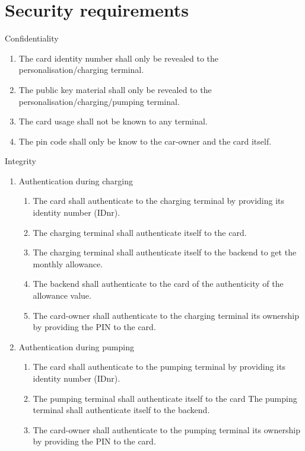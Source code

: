 \section*{Security requirements}
\begin{enumerate}
\item Confidentiality
	\begin{enumerate}
	\item The card identity number shall only be revealed to the personalisation/charging terminal.
	\item The public key material shall only be revealed to the personalisation/charging/pumping terminal.
	\item The card usage shall not be known to any terminal.
	\item The pin code shall only be know to the car-owner and the card itself.
	\end{enumerate}
\begin{minipage}{\linewidth}
\item Integrity
	\begin{enumerate}
	\item Authentication during charging
		\begin{enumerate}
		\item The card shall authenticate to the charging terminal by providing its identity number (IDnr).
		\item The charging terminal shall authenticate itself to the card.
		\item The charging terminal shall authenticate itself to the backend to get the monthly allowance.
		\item The backend shall authenticate to the card of the authenticity of the allowance value.
		\item The card-owner shall authenticate to the charging terminal its ownership by providing the PIN to the card.
		\end{enumerate}		
	\item Authentication during pumping
		\begin{enumerate}
		\item The card shall authenticate to the pumping terminal by providing its identity number (IDnr).
		\item The pumping terminal shall authenticate itself to the card
The pumping terminal shall authenticate itself to the backend.
		\item The card-owner shall authenticate to the pumping terminal its ownership by providing the PIN to the card.

\end{enumerate}
\end{enumerate}
\end{minipage}
\end{enumerate}
